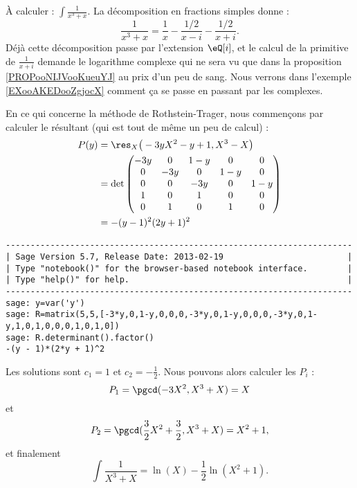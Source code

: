 \begin{example}     \label{EXooIPEQooGKDjea}
    À calculer : \( \int\frac{1}{ x^3+x }\). La décomposition en fractions simples donne :
    \begin{equation}
        \frac{1}{ x^3+x }= \frac{1}{ x }-\frac{ 1/2 }{ x-i }-\frac{ 1/2 }{ x+i }.
    \end{equation}
    Déjà cette décomposition passe par l'extension \( \eQ[i]\), et le calcul de la primitive de \( \frac{1}{ x+i }\) demande le logarithme complexe qui ne sera vu que dans la proposition \ref{PROPooNIJVooKueuYJ} au prix d'un peu de sang.
    Nous verrons dans l'exemple \ref{EXooAKEDooZgjocX} comment ça se passe en passant par les complexes.

    En ce qui concerne la méthode de Rothstein-Trager, nous commençons par calculer le résultant (qui est tout de même un peu de calcul) :
    \begin{subequations}
        \begin{align}
        P(y)&=\res_X\big( -3yX^2-y+1,X^3-X \big)\\
        &=\det\begin{pmatrix}
            -3y    &   0    &   1-y    &   0    &   0\\  
            0    &   -3y    &   0    &   1-y    &   0\\  
            0    &   0    &   -3y    &   0    &   1-y\\  
            1    &   0    &   1    &   0    &   0\\  
            0    &   1    &   0    &   1    &   0    
        \end{pmatrix}\\
        &=-(y-1)^2(2y+1)^2
        \end{align}
    \end{subequations}
    
    \begin{verbatim}
----------------------------------------------------------------------
| Sage Version 5.7, Release Date: 2013-02-19                         |
| Type "notebook()" for the browser-based notebook interface.        |
| Type "help()" for help.                                            |
----------------------------------------------------------------------
sage: y=var('y')
sage: R=matrix(5,5,[-3*y,0,1-y,0,0,0,-3*y,0,1-y,0,0,0,-3*y,0,1-y,1,0,1,0,0,0,1,0,1,0])
sage: R.determinant().factor()                                                        
-(y - 1)*(2*y + 1)^2
    \end{verbatim}
    Les solutions sont \( c_1=1\) et \( c_2=-\frac{ 1 }{2}\). Nous pouvons alors calculer les \( P_i\) :
    \begin{equation}
        P_1=\pgcd(-3X^2,X^3+X)=X
    \end{equation}
    et
    \begin{equation}
        P_2=\pgcd(\frac{ 3 }{2}X^2+\frac{ 3 }{2},X^3+X)=X^2+1,
    \end{equation}
    et finalement
    \begin{equation}
        \int\frac{ 1 }{ X^3+X }=\ln(X)-\frac{ 1 }{2}\ln(X^2+1).
    \end{equation}
\end{example}

